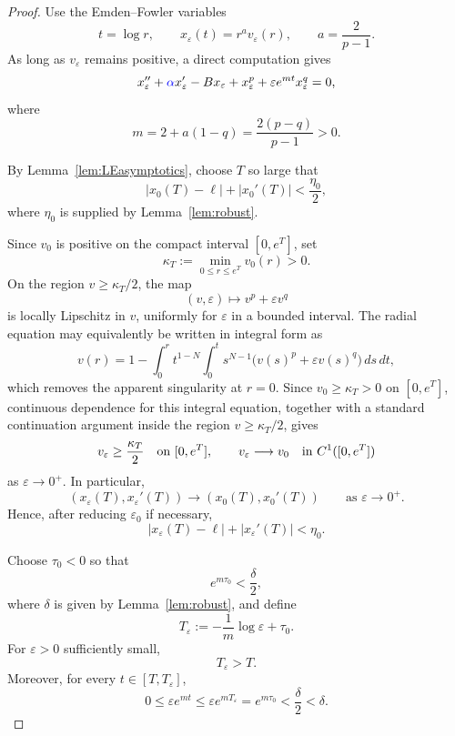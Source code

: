 \documentclass[11pt]{article}
\newcommand{\add}[1]{{\color{blue}#1}}
\newcommand{\oldrev}[1]{#1}
\newcommand{\damp}{\add{\alpha}}            %
\theoremstyle{definition}
\begin{document}
\begin{proof}
Use the Emden--Fowler variables
\[
t=\log r,
\qquad
x_\varepsilon(t)=r^av_\varepsilon(r),
\qquad
a=\frac2{p-1}.
\]
As long as $v_\varepsilon$ remains positive, a direct computation
gives
\begin{equation}
\label{eq:EFeps}
x_\varepsilon''
+\damp x_\varepsilon'
-Bx_\varepsilon
+x_\varepsilon^p
+\varepsilon e^{mt}x_\varepsilon^q
=0,
\end{equation}
where
\begin{equation}
\label{eq:m}
m
=
2+a(1-q)
=
\frac{2(p-q)}{p-1}
\oldrev{>0}.
\end{equation}

By Lemma~\ref{lem:LEasymptotics}, choose $T$ so large that
\[
|x_0(T)-\ell|+|x_0'(T)|
<
\frac{\eta_0}{2},
\]
where $\eta_0$ is supplied by Lemma~\ref{lem:robust}.

Since $v_0$ is positive on the compact interval $[0,e^T]$, set
\[
\kappa_T:=\min_{0\le r\le e^T}v_0(r)>0.
\]
On the region $v\ge \kappa_T/2$, the map
\[
(v,\varepsilon)\longmapsto v^p+\varepsilon v^q
\]
is locally Lipschitz in $v$, uniformly for $\varepsilon$ in a bounded
interval. The radial equation may equivalently be written in integral
form as
\[
v(r)=1-\int_0^r t^{1-N}\int_0^t
s^{N-1}\bigl(v(s)^p+\varepsilon v(s)^q\bigr)\,ds\,dt,
\]
which removes the apparent singularity at $r=0$.
\oldrev{Since $v_0\geq\kappa_T>0$ on $[0,e^T]$, continuous
dependence for this integral equation, together with a standard
continuation argument inside the region
$v\geq\kappa_T/2$, gives}
\[
v_\varepsilon\ge \frac{\kappa_T}{2}
\quad\hbox{on }[0,e^T],
\qquad
v_\varepsilon\longrightarrow v_0
\quad\hbox{in }C^1([0,e^T])
\]
\oldrev{as $\varepsilon\to0^+$.}
In particular,
\[
(x_\varepsilon(T),x_\varepsilon'(T))
\longrightarrow
(x_0(T),x_0'(T))
\qquad
\text{as }\varepsilon\to0^+.
\]
Hence, after reducing $\varepsilon_0$ if necessary,
\[
|x_\varepsilon(T)-\ell|
+
|x_\varepsilon'(T)|
<
\eta_0.
\]

Choose $\tau_0<0$ so that
\[
\oldrev{
e^{m\tau_0}<\frac{\delta}{2},
}
\]
where $\delta$ is given by Lemma~\ref{lem:robust}, and define
\[
T_\varepsilon
:=
-\frac1m\log\varepsilon+\tau_0.
\]
For $\varepsilon>0$ sufficiently small,
\[
T_\varepsilon>T.
\]
Moreover, for every $t\in[T,T_\varepsilon]$,
\[
0\leq
\varepsilon e^{mt}
\leq
\varepsilon e^{mT_\varepsilon}
=
e^{m\tau_0}
<
\oldrev{\frac{\delta}{2}<\delta}.
\]


\end{proof}
\end{document}

